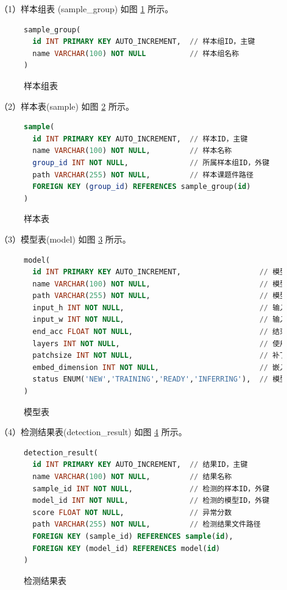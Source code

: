 \documentclass[
  ]{njuthesis}
\begin{document}
（1）样本组表 (sample\_group) 如图 \ref{样本组表} 所示。

\begin{figure}[H]
    \begin{lstlisting}[language=sql]
sample_group(
  id INT PRIMARY KEY AUTO_INCREMENT,  // 样本组ID，主键
  name VARCHAR(100) NOT NULL          // 样本组名称
)
    \end{lstlisting}
    \caption{样本组表}
    \label{样本组表}
\end{figure}

（2）样本表(sample) 如图 \ref{样本表} 所示。

\begin{figure}[H]
    \begin{lstlisting}[language=sql]
sample(
  id INT PRIMARY KEY AUTO_INCREMENT,  // 样本ID，主键
  name VARCHAR(100) NOT NULL,         // 样本名称
  group_id INT NOT NULL,              // 所属样本组ID，外键
  path VARCHAR(255) NOT NULL,         // 样本课题件路径
  FOREIGN KEY (group_id) REFERENCES sample_group(id)
)
    \end{lstlisting}
    \caption{样本表}
    \label{样本表}
\end{figure}

（3）模型表(model) 如图 \ref{模型表} 所示。

\begin{figure}[H]
    \begin{lstlisting}[language=sql]
model(
  id INT PRIMARY KEY AUTO_INCREMENT,                  // 模型ID，主键
  name VARCHAR(100) NOT NULL,                         // 模型名称
  path VARCHAR(255) NOT NULL,                         // 模型文件路径
  input_h INT NOT NULL,                               // 输入高度  
  input_w INT NOT NULL,                               // 输入宽度
  end_acc FLOAT NOT NULL,                             // 结束精度
  layers INT NOT NULL,                                // 使用的层数
  patchsize INT NOT NULL,                             // 补丁大小
  embed_dimension INT NOT NULL,                       // 嵌入维度
  status ENUM('NEW','TRAINING','READY','INFERRING'),  // 模型状态
)
    \end{lstlisting}
    \caption{模型表}
    \label{模型表}
\end{figure}

（4）检测结果表(detection\_result) 如图 \ref{检测结果表} 所示。

\begin{figure}[H]
    \begin{lstlisting}[language=sql]
detection_result(
  id INT PRIMARY KEY AUTO_INCREMENT,  // 结果ID，主键
  name VARCHAR(100) NOT NULL,         // 结果名称
  sample_id INT NOT NULL,             // 检测的样本ID，外键
  model_id INT NOT NULL,              // 检测的模型ID，外键
  score FLOAT NOT NULL,               // 异常分数
  path VARCHAR(255) NOT NULL,         // 检测结果文件路径
  FOREIGN KEY (sample_id) REFERENCES sample(id),
  FOREIGN KEY (model_id) REFERENCES model(id)
)
    \end{lstlisting}
    \caption{检测结果表}
    \label{检测结果表}
\end{figure}
\end{document}
